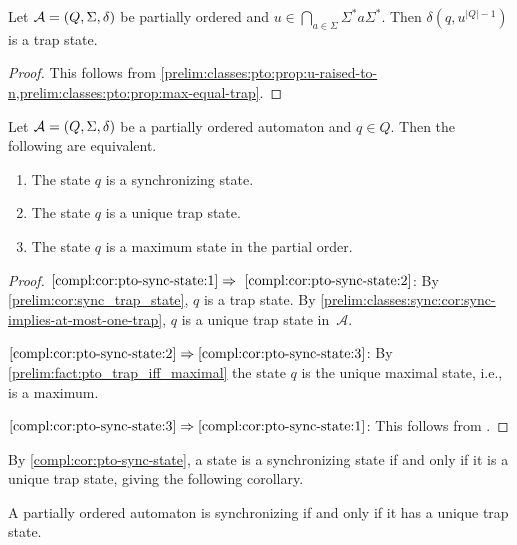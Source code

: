 \begin{proposition} \label{prelim:pto:prop:power-of-word-to-trap-state}
 Let $\mathcal A = (Q, \Sigma, \delta)$ be partially ordered
 and $u \in \bigcap_{a \in \Sigma} \Sigma^* a \Sigma^*$.
 Then $\delta(q, u^{|Q| - 1})$ is a trap state.	
\end{proposition}
\begin{proof}
	This follows from \cref{prelim:classes:pto:prop:u-raised-to-n,prelim:classes:pto:prop:max-equal-trap}.
\end{proof}

\begin{proposition}	\label{compl:cor:pto-sync-state}
	Let $\mathcal A = (Q, \Sigma, \delta)$ be a partially ordered automaton
	and $q \in Q$. Then the following are equivalent.
	\begin{enumerate}	
		\item \label{compl:cor:pto-sync-state:1} The state $q$ is a synchronizing state.
		
		\item \label{compl:cor:pto-sync-state:2} The state $q$ is a unique trap state.
		
		\item \label{compl:cor:pto-sync-state:3} The state $q$ is a maximum state in the partial order.
	\end{enumerate}
\end{proposition}
\begin{proof}
	$\ref{compl:cor:pto-sync-state:1} \Rightarrow~\ref{compl:cor:pto-sync-state:2}$: 
	By \cref{prelim:cor:sync_trap_state}, $q$ is a trap state.
	By \cref{prelim:classes:sync:cor:sync-implies-at-most-one-trap}, 
	$q$ is a unique trap state in~$\mathcal A$. 
	
	$\ref{compl:cor:pto-sync-state:2} \Rightarrow \ref{compl:cor:pto-sync-state:3}$: By \cref{prelim:fact:pto_trap_iff_maximal}
	the state $q$ is the unique maximal state, i.e., is a maximum.
	
	$\ref{compl:cor:pto-sync-state:3} \Rightarrow \ref{compl:cor:pto-sync-state:1}$: 
	This follows from .
\end{proof}

By \cref{compl:cor:pto-sync-state}, a state is a synchronizing
state if and only if it is a unique trap state, giving
the following corollary.

\begin{corollary}
	\label{compl:cor:pto_sync_trap}
	A partially ordered automaton is synchronizing
	if and only if it has a unique trap state.
\end{corollary}

